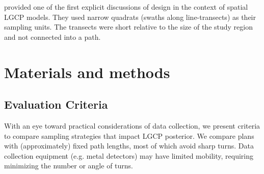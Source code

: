 \documentclass[review]{elsarticle}
\begin{document}
\citet{liuvanhatalo} provided one of the first explicit discussions of design
in the context of spatial LGCP models. They used narrow quadrats (swaths along
line-transects) as their sampling units. The transects were short relative to
the size of the study region and not connected into a path.







\section{Materials and methods}


\subsection{Evaluation Criteria}
With an eye toward practical considerations of data collection, we present
criteria to compare sampling strategies that impact LGCP posterior. We compare
plans with (approximately) fixed path lengths, most of which avoid sharp turns.
Data collection equipment (e.g. metal detectors) may have limited mobility,
requiring minimizing the number or angle of turns.
\end{document}
